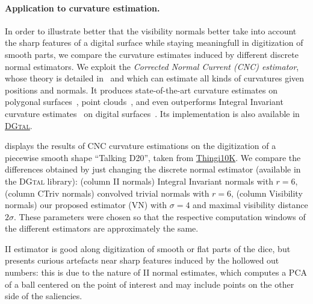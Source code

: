 \documentclass[runningheads]{llncs}
\begin{document}

    \paragraph{Application to curvature estimation.}
    In order to illustrate better that the visibility normals better
    take into account the sharp features of a digital surface while
    staying meaningfull in digitization of smooth parts, we compare
    the curvature estimates induced by different discrete normal
    estimators. We exploit the \emph{Corrected Normal Current (CNC)
        estimator}, whose theory is detailed in~\cite{lachaud:2022-dcg}
    and which can estimate all kinds of curvatures given positions and
    normals. It produces state-of-the-art curvature estimates on
    polygonal surfaces~\cite{lachaud:2020-cgf}, point clouds~\cite{lachaud:2023-cgf}, and even outperforms Integral Invariant
    curvature estimates~\cite{coeurjolly:2014-cviu} on digital
    surfaces~\cite{lachaud:2022-dcg}. Its implementation is also
    available in    \href{https://dgtal-team.github.io/doc-nightly/moduleCurvatureMeasures.html}{\textsc{DGtal}}.

     displays the results of CNC curvature
    estimations on the digitization of a piecewise smooth shape
    ``Talking D20'', taken from
    \href{https://ten-thousand-models.appspot.com/detail.html?file_id=1533028}{Thingi10K}.
    We compare the differences obtained by just changing the discrete
    normal estimator (available in the \textsc{DGtal} library):
    (column II normals) Integral Invariant normals with $r=6$, (column
    CTriv normals) convolved trivial normals with $r=6$, (column
    Visibility normals) our proposed estimator (VN) with $\sigma=4$ and
    maximal visibility distance $2\sigma$. These parameters were
    chosen so that the respective computation windows of the different
    estimators are approximately the same.

    II estimator is good along digitization of smooth or flat parts of
    the dice, but presents curious artefacts near sharp features
    induced by the hollowed out numbers: this is due to the nature of
    II normal estimates, which computes a PCA of a ball centered on
    the point of interest and may include points on the other side of
    the saliencies.
\end{document}
